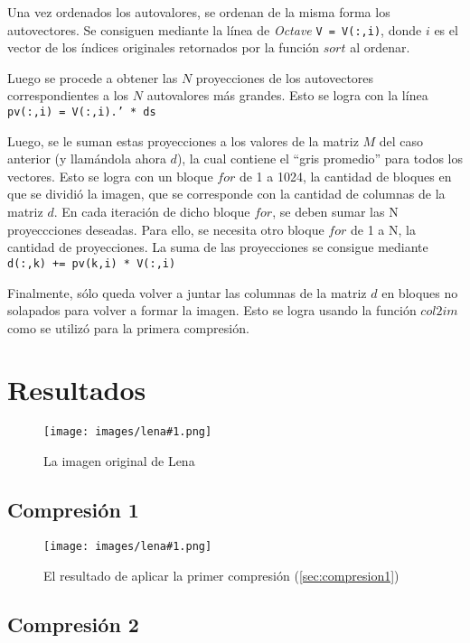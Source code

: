 \documentclass[twocolumn,a4paper,10pt]{article}
\begin{document}
Una vez ordenados los autovalores, se ordenan de la misma forma los autovectores. Se consiguen mediante la línea de \textit{Octave} \texttt{V = V(:,i)}, donde $i$ es el vector de los índices originales retornados por la función $sort$ al ordenar.

Luego se procede a obtener las $N$ proyecciones de los autovectores correspondientes a los $N$ autovalores más grandes. Esto se logra con la línea \texttt{pv(:,i) = V(:,i).' * ds}

Luego, se le suman estas proyecciones a los valores de la matriz $M$ del caso anterior (y llam\'andola ahora $d$), la cual contiene el ``gris promedio'' para todos los vectores. Esto se logra con un bloque $for$ de 1 a 1024, la cantidad de bloques en que se dividió la imagen, que se corresponde con la cantidad de columnas de la matriz $d$. En cada iteración de dicho bloque $for$, se deben sumar las N proyeccciones deseadas. Para ello, se necesita otro bloque $for$ de 1 a N, la cantidad de proyecciones. La suma de las proyecciones se consigue mediante \texttt{d(:,k)\: += pv(k,i) * V(:,i)}

Finalmente, s\'olo queda volver a juntar las columnas de la matriz $d$ en bloques no solapados para volver a formar la imagen. Esto se logra usando la funci\'on 
$col2im$ como se utilizó para la primera compresi\'on.

\section{Resultados}
\label{sec:resultados}

\newcommand{\lena}[2]{
    \begin{figure}[H]
        \texttt{[image: images/lena\#1.png]}
        \caption{#2}
        \label{fig:lena#1}
    \end{figure}
}

\lena{512}{La imagen original de Lena}

\subsection{Compresi\'on 1}

\lena{-bruta}{El resultado de aplicar la primer compresi\'on (\ref{sec:compresion1})}

\subsection{Compresi\'on 2}
\end{document}
